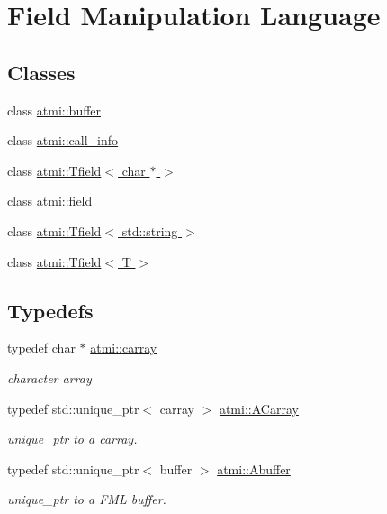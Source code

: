 \hypertarget{group__fml}{\section{Field Manipulation Language}
\label{group__fml}
}
\subsection*{Classes}
\begin{DoxyCompactItemize}
\item 
class \hyperlink{classatmi_1_1buffer}{atmi\+::buffer}
\item 
class \hyperlink{classatmi_1_1call__info}{atmi\+::call\+\_\+info}
\item 
class \hyperlink{classatmi_1_1_tfield_3_01char_01_5_01_4}{atmi\+::\+Tfield$<$ char $\ast$ $>$}
\item 
class \hyperlink{classatmi_1_1field}{atmi\+::field}
\item 
class \hyperlink{classatmi_1_1_tfield_3_01std_1_1string_01_4}{atmi\+::\+Tfield$<$ std\+::string $>$}
\item 
class \hyperlink{classatmi_1_1_tfield}{atmi\+::\+Tfield$<$ T $>$}
\end{DoxyCompactItemize}
\subsection*{Typedefs}
\begin{DoxyCompactItemize}
\item 
\hypertarget{group__fml_ga8b57f9a4e2453d8e5d82ac0016e35e87}{typedef char $\ast$ \hyperlink{group__fml_ga8b57f9a4e2453d8e5d82ac0016e35e87}{atmi\+::carray}}\label{group__fml_ga8b57f9a4e2453d8e5d82ac0016e35e87}

\begin{DoxyCompactList}\small\item\em character array \end{DoxyCompactList}\item 
\hypertarget{group__fml_ga095330dfead97321f0830e3fa204a24a}{typedef std\+::unique\+\_\+ptr$<$ carray $>$ \hyperlink{group__fml_ga095330dfead97321f0830e3fa204a24a}{atmi\+::\+A\+Carray}}\label{group__fml_ga095330dfead97321f0830e3fa204a24a}

\begin{DoxyCompactList}\small\item\em unique\+\_\+ptr to a carray. \end{DoxyCompactList}\item 
\hypertarget{group__fml_gaa6276ba0b9cf18dd00fae53b1ce132f4}{typedef std\+::unique\+\_\+ptr$<$ buffer $>$ \hyperlink{group__fml_gaa6276ba0b9cf18dd00fae53b1ce132f4}{atmi\+::\+Abuffer}}\label{group__fml_gaa6276ba0b9cf18dd00fae53b1ce132f4}

\begin{DoxyCompactList}\small\item\em unique\+\_\+ptr to a F\+M\+L buffer. \end{DoxyCompactList}\end{DoxyCompactItemize}
